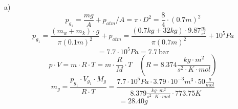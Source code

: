 a) 
\[
p_{g_1} = \frac{mg}{A} + p_{atm} / A = \pi \cdot D^2 = \frac{8}{4} \cdot (0.7m)^2
\]
\[
p_{g_1} = \frac{(m_w + m_k) \cdot g}{\pi (0.1m)^2} + p_{atm} = \frac{(0.7kg + 32kg) \cdot 9.87 \frac{m}{s^2}}{\pi (0.7m)^2} + 10^5 Pa
\]
\[
= 7.7 \cdot 10^5 Pa = 7.7 \, \text{bar}
\]
\[
p \cdot V = m \cdot R \cdot T = m \cdot \frac{R}{M} \cdot T \quad \left( R = 8.374 \frac{kg \cdot m^2}{s^2 \cdot K \cdot mol} \right)
\]
\[
m_g = \frac{p_{g_1} \cdot V_{g_1} \cdot M_g}{R \cdot T} = \frac{7.7 \cdot 10^5 Pa \cdot 3.79 \cdot 10^{-3} m^3 \cdot 50 \frac{g}{mol}}{8.379 \frac{kg \cdot m^2}{s^2 \cdot K \cdot mol} \cdot 773.75 K}
\]
\[
= 28.40 g
\]